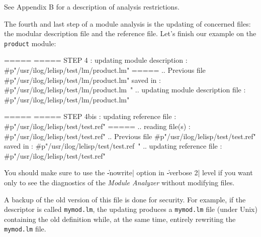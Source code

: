 
See Appendix B for a description of analysis restrictions.


The fourth and last step of a module analysis is the updating of concerned files:  the modular description file and the reference file.
Let's finish our example on the {\tt product} module:
\begin{Longcode*}
=====
===== STEP 4 : updating module description : #p"/usr/ilog/lelisp/test/lm/product.lm"
=====
.. Previous file #p"/usr/ilog/lelisp/test/lm/product.lm" saved in :
#p"/usr/ilog/lelisp/test/lm/product.lm~"
.. updating module description file : #p"/usr/ilog/lelisp/test/lm/product.lm"

=====
===== STEP 4bis : updating reference file : #p"/usr/ilog/lelisp/test/test.ref"
=====
.. reading file(s) : #p"/usr/ilog/lelisp/test/test.ref"
.. Previous file #p"/usr/ilog/lelisp/test/test.ref" saved in :
#p"/usr/ilog/lelisp/test/test.ref~"
.. updating reference file : #p"/usr/ilog/lelisp/test/test.ref"
\end{Longcode*}

You should make sure to use the \|-nowrite| option in \|-verbose 2| level if you want only to see the diagnostics of the {\em Module Analyzer} without modifying files.

A backup of the old version of this file is done for security.  For example, if the descriptor is called {\tt mymod.lm}, the updating produces a {\tt mymod.lm} file (under Unix) containing the old definition while, at the same time, entirely rewriting the {\tt mymod.lm} file.
